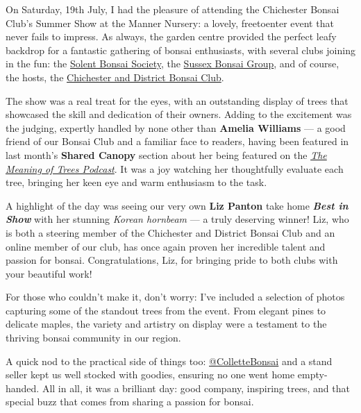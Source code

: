 \label{2025-07-chichester}
\noindent
On Saturday, 19th July, I had the pleasure of attending the Chichester Bonsai Club's Summer Show at the Manner Nursery: a lovely, free\-to\-enter event that never fails to impress.
As always, the garden centre provided the perfect leafy backdrop for a fantastic gathering of bonsai enthusiasts, with several clubs joining in the fun: the \href{https://www.wvca.co.uk}{Solent Bonsai Society}, the \href{https://sussexbonsaigroup.wordpress.com}{Sussex Bonsai Group}, and of course, the hosts, the \href{https://chichesterbonsai.uk}{Chichester and District Bonsai Club}.

\medskip
The show was a real treat for the eyes, with an outstanding display of trees that showcased the skill and dedication of their owners.
Adding to the excitement was the judging, expertly handled by none other than \textbf{Amelia Williams} --- a good friend of our Bonsai Club and a familiar face to readers, having been featured in last month's \textbf{Shared Canopy} section about her being featured on the \href{https://linktr.ee/themeaningoftreespodcast}{\emph{The Meaning of Trees Podcast}}.
It was a joy watching her thoughtfully evaluate each tree, bringing her keen eye and warm enthusiasm to the task.

\medskip
A highlight of the day was seeing our very own \textbf{Liz Panton} take home \textbf{\textit{Best in Show}} with her stunning \textit{Korean hornbeam} --- a truly deserving winner!
Liz, who is both a steering member of the Chichester and District Bonsai Club and an online member of our club, has once again proven her incredible talent and passion for bonsai.
Congratulations, Liz, for bringing pride to both clubs with your beautiful work!

\medskip
For those who couldn't make it, don't worry: I've included a selection of photos capturing some of the standout trees from the event.
From elegant pines to delicate maples, the variety and artistry on display were a testament to the thriving bonsai community in our region.

\medskip
A quick nod to the practical side of things too: \href{https://www.instagram.com/collettebonsai/}{@ColletteBonsai} and a stand seller kept us well stocked with goodies, ensuring no one went home empty\--handed.
All in all, it was a brilliant day: good company, inspiring trees, and that special buzz that comes from sharing a passion for bonsai.

